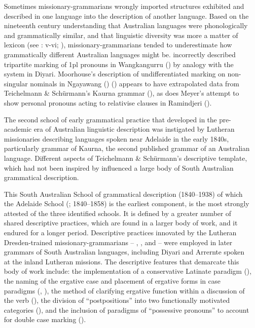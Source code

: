 Sometimes missionary-grammarians wrongly imported structures exhibited and described in one language into the description of another language. Based on the nineteenth century understanding that Australian languages were phonologically and grammatically similar, and that linguistic diversity was more a matter of lexicon (see \citealt{moorhouse_vocabulary_1846}: v-vi; \citealt{fraser_australian_1892}), missionary-grammarians tended to underestimate how grammatically different Australian languages might be. \citet{flierl_dieri_1880} incorrectly described tripartite marking of 1pl pronouns in Wangkangurru () by analogy with the system in Diyari. Moorhouse’s description of undifferentiated marking on non-singular nominals in Ngayawang (\citeyear{moorhouse_vocabulary_1846}) () appears to have extrapolated data from Teichelmann \& Schürmann’s Kaurna grammar (\citeyear{teichelmann_outlines_1840}), as does Meyer’s attempt to show personal pronouns acting to relativise clauses in Ramindjeri ().

The second school of early grammatical practice that developed in the pre-academic era of Australian linguistic description was instigated by Lutheran missionaries describing languages spoken near Adelaide in the early 1840s, particularly \citet{teichelmann_outlines_1840} grammar of Kaurna, the second published grammar of an Australian language. Different aspects of Teichelmann \& Schürmann’s descriptive template, which had not been inspired by \citet{Threlkeld1834} influenced a large body of South Australian grammatical description.

This South Australian School of grammatical description (1840--1938) of which the Adelaide School (\citealt[410]{simpson_notes_1992}; 1840--1858) is the earliest component, is the most strongly attested of the three identified schools. It is defined by a greater number of shared descriptive practices, which are found in a larger body of work, and it endured for a longer period. Descriptive practices innovated by the Lutheran Dresden-trained missionary-grammarians -- \citet{teichelmann_outlines_1840}, \citet{meyer_vocabulary_1843}, and \citet{schurmann_letter_1844} -- were employed in later grammars of South Australian languages, including Diyari and Arrernte spoken at the inland Lutheran missions. The descriptive features that demarcate this body of work include: the implementation of a conservative Latinate paradigm (), the naming of the ergative case and placement of ergative forms in case paradigms (, ), the method of clarifying ergative function within a discussion of the verb (), the division of “postpositions” into two functionally motivated categories (), and the inclusion of paradigms of “possessive pronouns” to account for double case marking ().

